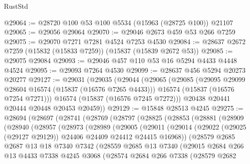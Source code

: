 \begin{lexlean}{RustStd}
\begin{coremodule}
{\begin{coremodule}
{{{{{{{{{{{{{{{{{{{{{{{{{{{{{{{{{{{{{{{{{{{{{{{{{{{{{{{{{{{{@29064 := @28720 @100 @53 @100 @5534 (@15963 (@28725 @100)) @21107
@29065 := @29056 @29064
@29070 := @29046 @2673 @459 @53 @266 @7259
@29075 := @29070 @7271 @7281 @4524 @7253 @4530
@29084 := @28637 @2672 @7259 (@15832 (@15833 @7259)) (@15837 (@15839 @2672 @53))
@29085 := @29075 @29084
@29093 := @29046 @457 @110 @53 @16 @5294 @4433 @4448 @4524
@29095 := @29093 @7264 @4530
@29099 := @28637 @456 @5294 @20273 @20277
@29127 := @29031
    (@29035
      (@29044
        (@29065
          (@29085
            (@29095 @29099 @28604 @16574 (@15837 (@16576 @7265 @4433)))
            @16574
            (@15837 (@16576 @7254 @7271)))
          @16574
          (@15837 (@16576 @7245 @7272)))
        @20438
        @20441
        @20444
        @20448
        @20453
        @20459))
@29129 := @15848 @28513 @4245
@29275 := @28694
    (@28697
      (@28741
        (@28769
          (@28797
            (@28825
              (@28853
                (@28881
                  (@28909
                    (@28940
                      (@28957
                        (@28973
                          (@28989
                            (@29005
                              (@29011
                                (@29014
                                  (@29022
                                    (@29025 (@29127 @29129))
                                    @24406
                                    @24409
                                    @24412
                                    @24415
                                    @16968))
                                (@28579
                                  @2685
                                  @2687
                                  @13
                                  @18
                                  @7340
                                  @7342
                                  (@28559
                                    @2685
                                    @13
                                    @7340
                                    (@29015
                                      @2684
                                      @266
                                      @13
                                      @4433
                                      @7338
                                      @4245
                                      @3068
                                      (@28574
                                        @2684
                                        @266
                                        @7338
                                        (@28579
                                          @2682
}}}}}}}}}}}}}}}}}}}}}}}}}}}}}}}}}}}}}}}}}}}}}}}}}}}}}}}}}}}}
\end{coremodule}}
\end{coremodule}
\end{lexlean}
